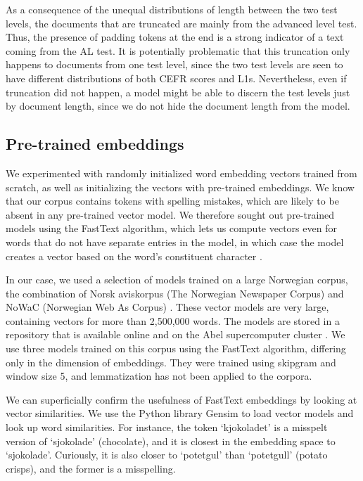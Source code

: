 As a consequence of the unequal distributions of length between the two test
levels, the documents that are truncated are mainly from the advanced level
test. Thus, the presence of padding tokens at the end is a strong indicator
of a text coming from the AL test. It is potentially problematic that this
truncation only happens to documents from one test level, since the two test
levels are seen to have different distributions of both CEFR scores and
\acp{L1}. Nevertheless, even if truncation did not happen, a model might be
able to discern the test levels just by document length, since we do not hide
the document length from the model.


\subsection{Pre-trained embeddings}
\label{subseq:fasttext}

We experimented with randomly initialized word embedding vectors trained from
scratch, as well as initializing the vectors with pre-trained embeddings. We
know that our corpus contains tokens with spelling mistakes, which are likely
to be absent in any pre-trained vector model. We therefore sought out
pre-trained models using the FastText algorithm, which lets us compute
vectors even for words that do not have separate entries in the model, in
which case the model creates a vector based on the word's constituent
character \ngrams.

In our case, we used a selection of models trained on a large Norwegian
corpus, the combination of Norsk aviskorpus (The Norwegian Newspaper Corpus)
and NoWaC (Norwegian Web As Corpus) \autocite{stadsnes2018}. These vector
models are very large, containing vectors for more than 2,500,000 words. The
models are stored in a repository that is available online and on the Abel
supercomputer cluster \autocite{murhaf2017repository}. We use three models
trained on this corpus using the FastText algorithm, differing only in the
dimension of embeddings. They were trained using skipgram and window size 5, 
and lemmatization has not been applied to the corpora.

We can superficially confirm the usefulness of FastText embeddings by looking
at vector similarities. We use the Python library Gensim \autocite{gensim} to
load vector models and look up word similarities. For instance, the token
`kjokoladet' is a misspelt version of `sjokolade' (chocolate), and it is
closest in the embedding space to `sjokolade'. Curiously, it is also closer
to `potetgul' than `potetgull' (potato crisps), and the former is a
misspelling.

